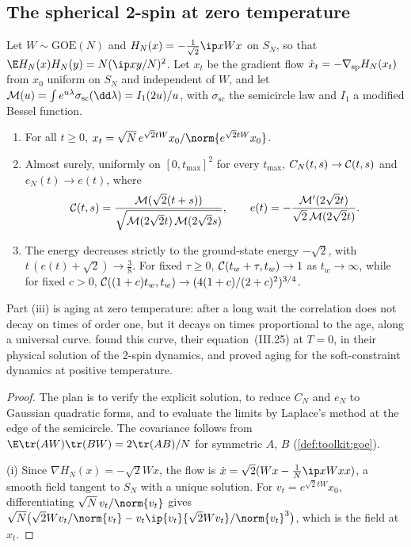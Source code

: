\begin{refsection}
\subsection{The spherical 2-spin at zero temperature}

\begin{theorem}\label{thm:dmft:twospin}
Let $W\sim\mathrm{GOE}(N)$ and $H_N(x)=-\frac1{\sqrt2}\ip x{Wx}$ on $S_N$, so that $\E H_N(x)H_N(y)=N(\ip xy/N)^2$. Let $x_t$ be the gradient flow $\dot x_t=-\nabla_{\mathrm{sp}}H_N(x_t)$ from $x_0$ uniform on $S_N$ and independent of $W$, and let $\dmftM(u)=\int e^{u\lambda}\sigma_{\mathrm{sc}}(\dd\lambda)=I_1(2u)/u$, with $\sigma_{\mathrm{sc}}$ the semicircle law and $I_1$ a modified Bessel function.
\begin{enumerate}
\item For all $t\ge0$, $x_t=\sqrt N\,e^{\sqrt2tW}x_0/\norm{e^{\sqrt2tW}x_0}$.
\item Almost surely, uniformly on $[0,t_{\max}]^2$ for every $t_{\max}$, $C_N(t,s)\to\mathcal{C}(t,s)$ and $e_N(t)\to e(t)$, where
\[
\mathcal{C}(t,s)=\frac{\mathcal{M}(\sqrt2(t+s))}{\sqrt{\mathcal{M}(2\sqrt2t)\,\mathcal{M}(2\sqrt2s)}},\qquad e(t)=-\frac{\mathcal{M}'(2\sqrt2t)}{\sqrt2\,\mathcal{M}(2\sqrt2t)}.
\]
\item The energy decreases strictly to the ground-state energy $-\sqrt2$, with $t\,(e(t)+\sqrt2)\to\frac38$. For fixed $\tau\ge0$, $\mathcal{C}(t_w+\tau,t_w)\to1$ as $t_w\to\infty$, while for fixed $c>0$, $\mathcal{C}((1+c)t_w,t_w)\to(4(1+c)/(2+c)^2)^{3/4}$.
\end{enumerate}
\end{theorem}

Part (iii) is aging at zero temperature: after a long wait the correlation does not decay on times of order one, but it decays on times proportional to the age, along a universal curve. \Textcite{CugliandoloDean1995} found this curve, their equation~(III.25) at $T=0$, in their physical solution of the $2$-spin dynamics, and \textcite{BenArousDemboGuionnet2001} proved aging for the soft-constraint dynamics at positive temperature.

\begin{proof}
The plan is to verify the explicit solution, to reduce $C_N$ and $e_N$ to Gaussian quadratic forms, and to evaluate the limits by Laplace's method at the edge of the semicircle. The covariance follows from $\E\tr(AW)\tr(BW)=2\tr(AB)/N$ for symmetric $A$, $B$ (\cref{def:toolkit:goe}).

(i) Since $\nabla H_N(x)=-\sqrt2Wx$, the flow is $\dot x=\sqrt2(Wx-\frac1N\ip x{Wx}x)$, a smooth field tangent to $S_N$ with a unique solution. For $v_t=e^{\sqrt2tW}x_0$, differentiating $\sqrt N\,v_t/\norm{v_t}$ gives $\sqrt N\bigl(\sqrt2Wv_t/\norm{v_t}-v_t\ip{v_t}{\sqrt2Wv_t}/\norm{v_t}^3\bigr)$, which is the field at $x_t$.


\end{proof}
\end{refsection}
